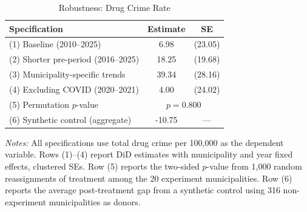 \begin{table}[t]
\centering
\caption{Robustness: Drug Crime Rate}
\label{tab:robustness}
\begin{tabular}{lcc}
\hline\hline
Specification & Estimate & SE \\
\hline
(1) Baseline (2010--2025) & 6.98 & (23.05) \\
(2) Shorter pre-period (2016--2025) & 18.25 & (19.68) \\
(3) Municipality-specific trends & 39.34 & (28.16) \\
(4) Excluding COVID (2020--2021) & 4.00 & (24.02) \\
(5) Permutation $p$-value & \multicolumn{2}{c}{$p = 0.800$} \\
(6) Synthetic control (aggregate) & -10.75 & --- \\
\hline\hline
\end{tabular}
\begin{tablenotes}
\item \textit{Notes:} All specifications use total drug crime per 100,000 as the dependent variable. Rows (1)--(4) report DiD estimates with municipality and year fixed effects, clustered SEs. Row (5) reports the two-sided $p$-value from 1,000 random reassignments of treatment among the 20 experiment municipalities. Row (6) reports the average post-treatment gap from a synthetic control using 316 non-experiment municipalities as donors.
\end{tablenotes}
\end{table}

